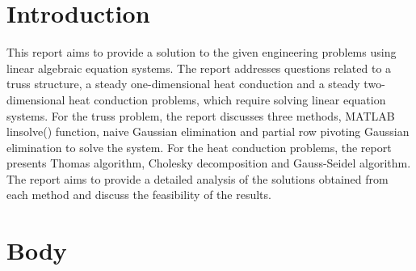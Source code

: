 \documentclass[12pt, a4paper]{article}
\begin{document}


\newpage
    \renewcommand{\contentsname}{Table of Contents}
    \tableofcontents
\newpage

\section{Introduction}

This report aims to provide a solution to the given engineering problems using linear algebraic equation systems. The report addresses questions related to a truss structure, a steady one-dimensional heat conduction and a steady two-dimensional heat conduction problems, which require solving linear equation systems. For the truss problem, the report discusses three methods, MATLAB linsolve() function, naive Gaussian elimination and partial row pivoting Gaussian elimination to solve the system. For the heat conduction problems, the report presents Thomas algorithm, Cholesky decomposition and Gauss-Seidel algorithm. The report aims to provide a detailed analysis of the solutions obtained from each method and discuss the feasibility of the results.

\section{Body}
\end{document}
